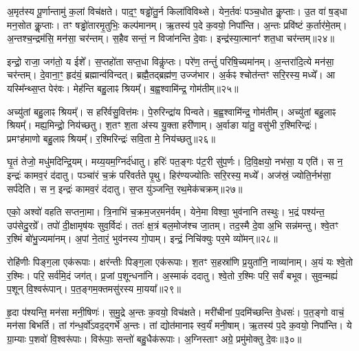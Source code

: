अ॒मृत॑स्य पू॒र्णान्तामु॑ क॒लां  विच॑क्षते। 
पाद॒ꣳ॒ षड्ढो॑तु॒र्न किला॑विविथ्से। 
येन॒र्तवः॑ पञ्च॒धोत कॢ॒प्ताः। 
उ॒त वा॑ ष॒ड्धा मन॒सोत कॢ॒प्ताः। 
तꣳ षड्ढो॑तारमृ॒तुभिः॒ कल्प॑मानम्। 
ऋ॒तस्य॑ प॒दे क॒वयो॒ निपा᳚न्ति। 
अ॒न्तः प्रवि॑ष्टं क॒र्तार॑मे॒तम्। 
अ॒न्तश्च॒न्द्रम॑सि॒ मन॑सा॒ चर॑न्तम्। 
स॒हैव सन्तं॒ न विजा॑नन्ति दे॒वाः। 
इन्द्र॑स्या॒त्मानꣳ॑ शत॒धा चर॑न्तम्॥२४॥%

इन्द्रो॒ राजा॒ जग॑तो॒ य ईशे᳚। 
स॒प्तहो॑ता सप्त॒धा विकॢ॑प्तः। 
परे॑ण॒ तन्तुं॑ परिषि॒च्यमा॑नम्। 
अ॒न्तरा॑दि॒त्ये मन॑सा॒ चर॑न्तम्। 
दे॒वाना॒ꣳ॒ हृद॑यं॒ ब्रह्मान्व॑विन्दत्। 
ब्रह्मै॒तद्ब्रह्म॑ण॒ उज्ज॑भार। 
अ॒र्कꣴ श्चोत॑न्तꣳ सरि॒रस्य॒ मध्ये᳚। 
आ यस्मि᳚न्थ्स॒प्त पेर॑वः। 
मेह॑न्ति बहु॒लाꣴ श्रियम्᳚। 
ब॒ह्व॒श्वामि॑न्द्र॒ गोम॑तीम्॥२५॥%

अच्यु॑तां बहु॒लाꣴ श्रियम्᳚। 
स हरि॑र्वसु॒वित्त॑मः। 
पे॒रुरिन्द्रा॑य पिन्वते। 
ब॒ह्व॒श्वामि॑न्द्र॒ गोम॑तीम्। 
अच्यु॑तां बहु॒लाꣴ श्रियम्᳚। 
मह्य॒मिन्द्रो॒ निय॑च्छतु। 
श॒तꣳ श॒ता अ॑स्य यु॒क्ता हरी॑णाम्। 
अ॒र्वाङा या॑तु॒ वसु॑भी र॒श्मिरिन्द्रः॑। 
प्रमꣳह॑माणो बहु॒लाꣴ श्रियम्᳚। 
र॒श्मिरिन्द्रः॑ सवि॒ता मे॒ निय॑च्छतु॥२६॥%

घृ॒तं तेजो॒ मधु॑मदिन्द्रि॒यम्। 
मय्य॒यम॒ग्निर्द॑धातु। 
हरिः॑ पत॒ङ्गः प॑ट॒री सु॑प॒र्णः। 
दि॒वि॒क्षयो॒ नभ॑सा॒ य एति॑। 
स न॒ इन्द्रः॑ कामव॒रं द॑दातु। 
पञ्चा॑रं च॒क्रं परि॑वर्तते पृ॒थु। 
हिर॑ण्यज्योतिः सरि॒रस्य॒ मध्ये᳚। 
अज॑स्रं॒ ज्योति॒र्नभ॑सा॒ सर्प॑देति। 
स न॒ इन्द्रः॑ कामव॒रं द॑दातु। 
स॒प्त यु॑ञ्जन्ति॒ रथ॒मेक॑चक्रम्॥२७॥%

एको॒ अश्वो॑ वहति सप्तना॒मा। 
त्रि॒नाभि॑ च॒क्रम॒जर॒मन॑र्वम्। 
येने॒मा विश्वा॒ भुव॑नानि तस्थुः। 
भ॒द्रं पश्य॑न्त॒ उप॑सेदु॒रग्रे᳚। 
तपो॑ दी॒क्षामृष॑यः सुव॒र्विदः॑। 
ततः॑ क्ष॒त्रं बल॒मोज॑श्च जा॒तम्। 
तद॒स्मै दे॒वा अ॒भि सन्न॑मन्तु। 
श्वे॒तꣳ र॒श्मिं बो॑भु॒ज्यमा॑नम्। 
अ॒पां ने॒तारं॒ भुव॑नस्य गो॒पाम्। 
इन्द्रं॒ निचि॑क्युः पर॒मे व्यो॑मन्॥२८॥

रोहि॑णीः पिङ्ग॒ला एक॑रूपाः। 
क्षर॑न्तीः पिङ्ग॒ला एक॑रूपाः। 
श॒तꣳ स॒हस्रा॑णि प्र॒युता॑नि॒ नाव्या॑नाम्। 
अ॒यं यः श्वे॒तो र॒श्मिः। 
परि॒ सर्व॑मि॒दं जग॑त्। 
प्र॒जां प॒शून्धना॑नि। 
अ॒स्माकं॑ ददातु। 
श्वे॒तो र॒श्मिः परि॒ सर्वं॑ बभूव। 
सुव॒न्मह्यं॑ प॒शून् वि॒श्वरू॑पान्। 
प॒त॒ङ्गम॒क्तमसु॑रस्य मा॒यया᳚॥२९॥%

हृ॒दा प॑श्यन्ति॒ मन॑सा मनी॒षिणः॑। 
स॒मु॒द्रे अ॒न्तः क॒वयो॒ विच॑क्षते। 
मरी॑चीनां प॒दमि॑च्छन्ति वे॒धसः॑। 
प॒त॒ङ्गो वाचं॒ मन॑सा बिभर्ति। 
तां ग॑न्ध॒र्वो॑ऽवद॒द्गर्भे॑ अ॒न्तः। 
तां द्योत॑मानाꣴ स्व॒र्यं॑ मनी॒षाम्। 
ऋ॒तस्य॑ प॒दे क॒वयो॒ निपा᳚न्ति। 
ये ग्रा॒म्याः प॒शवो॑ वि॒श्वरू॑पाः। 
विरू॑पाः॒ सन्तो॑ बहु॒धैक॑रूपाः। 
अ॒ग्निस्ताꣳ अग्रे॒ प्रमु॑मोक्तु दे॒वः॥३०॥

